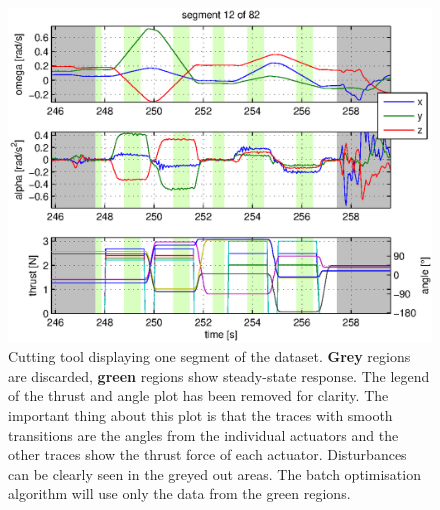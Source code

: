 \begin{figure}[htbp]
\centering
\includegraphics[scale=0.8]{images/interactive_cut/interactive_cut_detail_modified.eps}
\caption{Cutting tool displaying one segment of the dataset. 
\textbf{Grey} regions are discarded, \textbf{green} regions show steady-state response.
The legend of the thrust and angle plot has been removed for clarity. The important thing about this plot is that the traces with smooth transitions are the angles from the individual actuators and the other traces show the thrust force of each actuator.
Disturbances can be clearly seen in the greyed out areas.
The batch optimisation algorithm will use only the data from the green regions.}
\end{figure}

